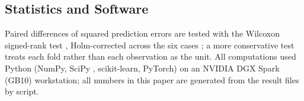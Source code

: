 \subsection{Statistics and Software}
Paired differences of squared prediction errors are tested with the Wilcoxon signed-rank test \cite{wilcoxon1945}, Holm-corrected across the six cases \cite{holm1979}; a more conservative test treats each fold rather than each observation as the unit. All computations used Python (NumPy, SciPy \cite{virtanen2020}, scikit-learn, PyTorch) on an NVIDIA DGX Spark (GB10) workstation; all numbers in this paper are generated from the result files by script.
